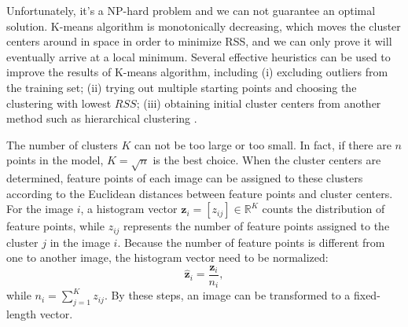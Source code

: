 \documentclass[conference]{IEEEtran}
\begin{document}
Unfortunately, it's a NP-hard problem and we can not guarantee an optimal solution. K-means algorithm is monotonically decreasing, which moves the cluster centers around in space in order to minimize RSS, and we can only prove it will eventually arrive at a local minimum. Several effective heuristics can be used to improve the results of K-means algorithm, including (i)  excluding outliers from the training set; (ii) trying out multiple starting points and choosing the clustering with lowest $RSS$; (iii) obtaining initial cluster centers from another method such as hierarchical clustering \cite{proving}.

The number of clusters $K$ can not be too large or too small. In fact, if there are $n$ points in the model, $K = \sqrt{n}$ is the best choice\cite{knn}. When the cluster centers are determined, feature points of each image can be assigned to these clusters according to the Euclidean distances between feature points and cluster centers. For the image $i$, a histogram vector $\mathbf{z}_i = [z_{ij}] \in \mathbb{R}^{K}$ counts the distribution of feature points, while $z_{ij}$ represents the number of feature points assigned to the cluster $j$ in the image $i$. Because the number of feature points is different from one to another image, the histogram vector need to be normalized:
\begin{equation}
	\hat{\mathbf{z}}_{i} = \frac{\mathbf{z}_{i}}{n_i},
\end{equation}
while $n_i = \sum\limits_{j=1}^{K}z_{ij}$. By these steps, an image can be transformed to a fixed-length vector.
\end{document}

